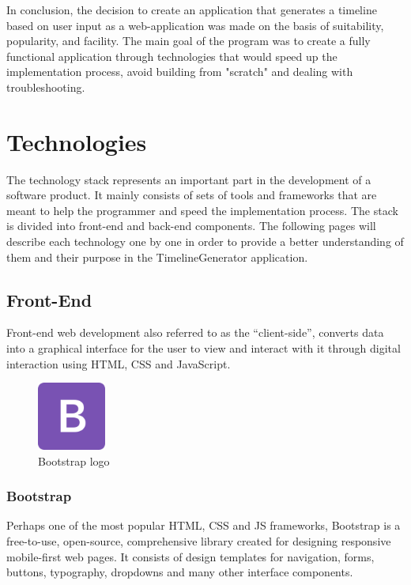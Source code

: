 \documentclass{report}
\begin{document}
In conclusion, the decision to create an application that generates a timeline based on user input as a web-application was made on the basis of suitability, popularity, and facility. The main goal of the program was to create a fully functional application through technologies that would speed up the implementation process, avoid building from "scratch" and dealing with troubleshooting. \par

\newpage

\chapter {Technologies}

The technology stack represents an important part in the development of a software product. It mainly consists of sets of tools and frameworks that are meant to help the programmer and speed the implementation process. The stack is divided into front-end and back-end components. The following pages will describe each technology one by one in order to provide a better understanding of them and their purpose in the TimelineGenerator application. 
 
\section {Front-End}
Front-end web development also referred to as the “client-side”, converts data into a graphical interface for the user to view and interact with it through digital interaction using HTML, CSS and JavaScript.

\begin{figure}
	\vspace*{-1.5cm}
    \centering
    \includegraphics[width=0.2\textwidth]{bootstrap}
	\caption{Bootstrap logo}
	\vspace{-10pt} 
\end{figure}

\subsection {Bootstrap}
Perhaps one of the most popular HTML, CSS and JS frameworks, Bootstrap is a free-to-use, open-source, comprehensive library created for designing responsive mobile-first web pages. It consists of design templates for navigation, forms, buttons, typography, dropdowns and many other interface components. \par
\end{document}
